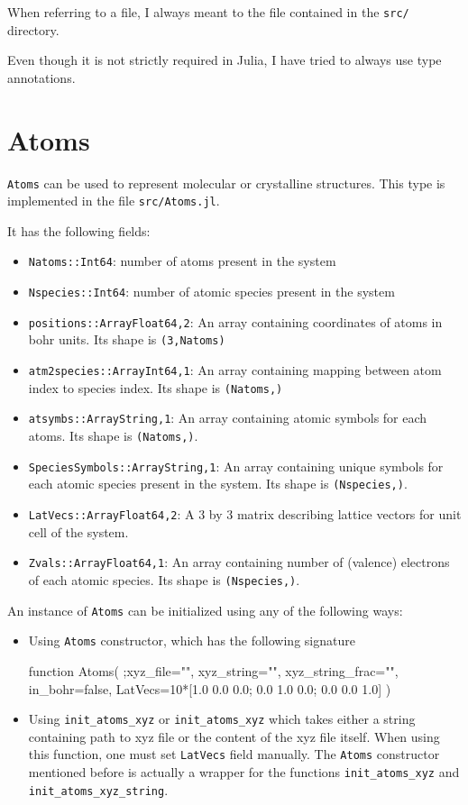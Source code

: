 \documentclass[a4paper,12pt]{article}
\newcommand{\jlcode}[1]{\texttt{#1}}
\newcommand{\myverbcode}[1]{\texttt{#1}}
\begin{document}
When referring to a file, I always meant to the file contained in
the \texttt{src/} directory.

Even though it is not strictly required in Julia, I have tried to always
use type annotations.

\section{Atoms}

\texttt{Atoms} can be used to represent molecular or crystalline structures.
This type is implemented in the file \myverbcode{src/Atoms.jl}.

It has the following fields:
\begin{itemize}
%
\item \jlcode{Natoms::Int64}: number of atoms present in the system
%
\item \jlcode{Nspecies::Int64}: number of atomic species present in the system
%
\item \jlcode{positions::Array{Float64,2}}: An array containing coordinates of atoms
  in bohr units. Its shape is \jlcode{(3,Natoms)}
%
\item \jlcode{atm2species::Array{Int64,1}}: An array containing mapping between atom index
  to species index. Its shape is \jlcode{(Natoms,)}
%
\item \jlcode{atsymbs::Array{String,1}}: An array containing atomic symbols for each atoms.
  Its shape is \jlcode{(Natoms,)}.
%
\item \jlcode{SpeciesSymbols::Array{String,1}}: An array containing unique symbols
  for each atomic species present in the system. Its shape is \jlcode{(Nspecies,)}.
%
\item \jlcode{LatVecs::Array{Float64,2}}: A 3 by 3 matrix describing lattice vectors for unit
  cell of the system.
%
\item \jlcode{Zvals::Array{Float64,1}}: An array containing number of (valence)
  electrons of each atomic species. Its shape is \verb|(Nspecies,)|.
\end{itemize}

An instance of \jlcode{Atoms} can be initialized using any of the following ways:

\begin{itemize}
\item Using \jlcode{Atoms} constructor, which has the following signature
%
\begin{juliacode}
function Atoms( ;xyz_file="", xyz_string="", xyz_string_frac="",
                in_bohr=false,
                LatVecs=10*[1.0 0.0 0.0; 0.0 1.0 0.0; 0.0 0.0 1.0] )
\end{juliacode}
%
\item Using \jlcode{init_atoms_xyz} or \jlcode{init_atoms_xyz}
  which takes either
  a string containing path to xyz file or the content of the xyz file
  itself. When using this function, one must set \jlcode{LatVecs}
  field manually.
  The \jlcode{Atoms} constructor mentioned before is actually
  a wrapper for the functions
  \jlcode{init_atoms_xyz} and \jlcode{init_atoms_xyz_string}.
\end{itemize}
\end{document}
